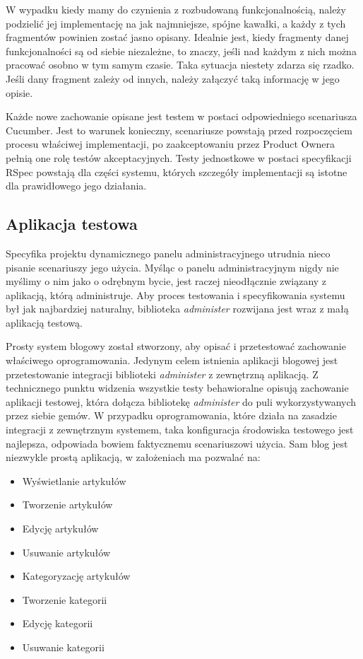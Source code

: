   W wypadku kiedy mamy do czynienia z rozbudowaną funkcjonalnością, należy podzielić jej implementację na jak najmniejsze, spójne kawałki, a każdy z tych fragmentów powinien zostać jasno opisany. Idealnie jest, kiedy fragmenty danej funkcjonalności są od siebie niezależne, to znaczy, jeśli nad każdym z nich można pracować osobno w tym samym czasie. Taka sytuacja niestety zdarza się rzadko. Jeśli dany fragment zależy od innych, należy załączyć taką informację w jego opisie.
  
  Każde nowe zachowanie opisane jest testem w postaci odpowiedniego scenariusza Cucumber. Jest to warunek konieczny, scenariusze powstają przed rozpoczęciem procesu właściwej implementacji, po zaakceptowaniu przez Product Ownera pełnią one rolę testów akceptacyjnych. Testy jednostkowe w postaci specyfikacji RSpec powstają dla części systemu, których szczegóły implementacji są istotne dla prawidłowego jego działania.
  
  \subsection{Aplikacja testowa}
  Specyfika projektu dynamicznego panelu administracyjnego utrudnia nieco pisanie scenariuszy jego użycia. Myśląc o panelu administracyjnym nigdy nie myślimy o nim jako o odrębnym bycie, jest raczej nieodłącznie związany z aplikacją, którą administruje. Aby proces testowania i specyfikowania systemu był jak najbardziej naturalny, biblioteka \emph{administer} rozwijana jest wraz z małą aplikacją testową.
  
  Prosty system blogowy został stworzony, aby opisać i przetestować zachowanie właściwego oprogramowania. Jedynym celem istnienia aplikacji blogowej jest przetestowanie integracji biblioteki \emph{administer} z zewnętrzną aplikacją. Z technicznego punktu widzenia wszystkie testy behawioralne opisują zachowanie aplikacji testowej, która dołącza bibliotekę \emph{administer} do puli wykorzystywanych przez siebie gemów. W przypadku oprogramowania, które działa na zasadzie integracji z zewnętrznym systemem, taka konfiguracja środowiska testowego jest najlepsza, odpowiada bowiem faktycznemu scenariuszowi użycia. Sam blog jest niezwykle prostą aplikacją, w założeniach ma pozwalać na:
  
  \begin{itemize}
    \item Wyświetlanie artykułów
    \item Tworzenie artykułów
    \item Edycję artykułów
    \item Usuwanie artykułów
    \item Kategoryzację artykułów
    \item Tworzenie kategorii
    \item Edycję kategorii
    \item Usuwanie kategorii
  \end{itemize}
  
